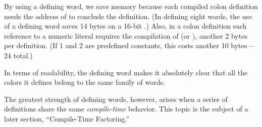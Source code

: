 By using a defining word, we save memory because each compiled colon
definition needs the address of  to conclude the
definition. (In defining eight words, the use of a defining word saves
14 bytes on a 16-bit \Forth{}.) Also, in a colon definition each
reference to a numeric literal requires the compilation of
 (or ), another 2 bytes per
definition. (If 1 and 2 are predefined constants, this costs another
10 bytes---24 total.)

In terms of readability, the defining word makes it absolutely clear
that all the colors it defines belong to the same family of words.

The greatest strength of defining words, however, arises when a series
of definitions share the same \emph{compile-time} behavior. This topic
is the subject of a later section, ``Compile-Time Factoring.''

